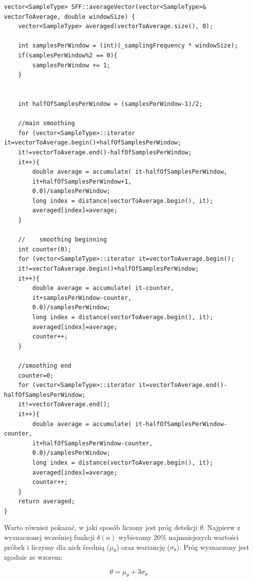 \documentclass[eng,printmode]{mgr}
\begin{document}
\lstset{language=C++,basicstyle=\scriptsize}
\begin{lstlisting}
vector<SampleType> SFF::averageVector(vector<SampleType>& vectorToAverage, double windowSize) {
	vector<SampleType> averaged(vectorToAverage.size(), 0);
	
	int samplesPerWindow = (int)(_samplingFrequency * windowSize);
	if(samplesPerWindow%2 == 0){
		samplesPerWindow += 1;
	}
	
	
	int halfOfSamplesPerWindow = (samplesPerWindow-1)/2;
	
	//main smoothing
	for (vector<SampleType>::iterator it=vectorToAverage.begin()+halfOfSamplesPerWindow;
	it!=vectorToAverage.end()-halfOfSamplesPerWindow;
	it++){
		double average = accumulate( it-halfOfSamplesPerWindow,
		it+halfOfSamplesPerWindow+1,
		0.0)/samplesPerWindow;
		long index = distance(vectorToAverage.begin(), it);
		averaged[index]=average;
	}
	
	//    smoothing beginning
	int counter(0);
	for (vector<SampleType>::iterator it=vectorToAverage.begin();
	it!=vectorToAverage.begin()+halfOfSamplesPerWindow;
	it++){
		double average = accumulate( it-counter,
		it+samplesPerWindow-counter,
		0.0)/samplesPerWindow;
		long index = distance(vectorToAverage.begin(), it);
		averaged[index]=average;
		counter++;	
	}
	
	//smoothing end
	counter=0;
	for (vector<SampleType>::iterator it=vectorToAverage.end()-halfOfSamplesPerWindow;
	it!=vectorToAverage.end();
	it++){
		double average = accumulate( it-halfOfSamplesPerWindow-counter,
		it+halfOfSamplesPerWindow-counter,
		0.0)/samplesPerWindow;
		long index = distance(vectorToAverage.begin(), it);
		averaged[index]=average;
		counter++;
	}
	return averaged;
}
\end{lstlisting}\vspace{5mm}

Warto również pokazać, w jaki sposób liczony jest próg detekcji $\theta$. Najpierw z wyznaczonej wcześniej funkcji $\delta(n)$ wybieramy 20\% najmniejszych wartości próbek i liczymy dla nich średnią ($\mu_{\theta}$) oraz wariancję ($\sigma_{\theta}$). Próg wyznaczany jest zgodnie ze wzorem:

\begin{equation}
	\theta = \mu_{\theta} + 3\sigma_{\theta}
\end{equation}
\end{document}
